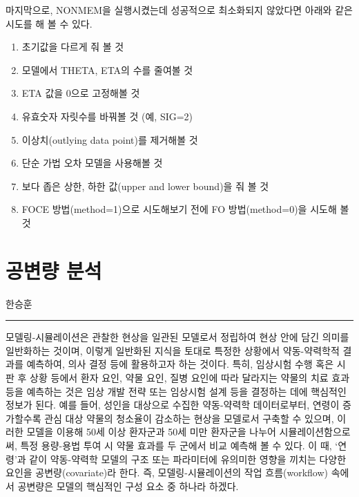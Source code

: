 \documentclass[
  11pt,
  krantz2,
  a4paper]{krantz}
\providecommand{\tightlist}{%
  \setlength{\itemsep}{0pt}\setlength{\parskip}{0pt}}
\theoremstyle{definition}
\theoremstyle{definition}
\theoremstyle{definition}
\theoremstyle{remark}
\begin{document}
마지막으로, NONMEM을 실행시켰는데 성공적으로 최소화되지 않았다면 아래와 같은 시도를 해 볼 수 있다.

\begin{enumerate}
\def\labelenumi{\arabic{enumi}.}
\tightlist
\item
  초기값을 다르게 줘 볼 것
\item
  모델에서 THETA, ETA의 수를 줄여볼 것
\item
  ETA 값을 0으로 고정해볼 것
\item
  유효숫자 자릿수를 바꿔볼 것 (예, SIG=2)
\item
  이상치(outlying data point)를 제거해볼 것 
\item
  단순 가법 오차 모델을 사용해볼 것
\item
  보다 좁은 상한, 하한 값(upper and lower bound)을 줘 볼 것
\item
  FOCE 방법(method=1)으로 시도해보기 전에 FO 방법(method=0)을 시도해 볼 것
\end{enumerate}

\hypertarget{covariate-analysis}{%
\chapter{공변량 분석}\label{covariate-analysis}}

\Large\hfill

한승훈
\normalsize

\begin{center}\rule{0.5\linewidth}{0.5pt}\end{center}

모델링-시뮬레이션은 관찰한 현상을 일관된 모델로서 정립하여 현상 안에 담긴 의미를 일반화하는 것이며, 이렇게 일반화된 지식을 토대로 특정한 상황에서 약동-약력학적 결과를 예측하여, 의사 결정 등에 활용하고자 하는 것이다. 특히, 임상시험 수행 혹은 시판 후 상황 등에서 환자 요인, 약물 요인, 질병 요인에 따라 달라지는 약물의 치료 효과 등을 예측하는 것은 임상 개발 전략 또는 임상시험 설계 등을 결정하는 데에 핵심적인 정보가 된다. 예를 들어, 성인을 대상으로 수집한 약동-약력학 데이터로부터, 연령이 증가할수록 관심 대상 약물의 청소율이 감소하는 현상을 모델로서 구축할 수 있으며, 이러한 모델을 이용해 50세 이상 환자군과 50세 미만 환자군을 나누어 시뮬레이션함으로써, 특정 용량-용법 투여 시 약물 효과를 두 군에서 비교 예측해 볼 수 있다. 이 때, `연령'과 같이 약동-약력학 모델의 구조 또는 파라미터에 유의미한 영향을 끼치는 다양한 요인을 공변량(covariate)라 한다. 즉, 모델링-시뮬레이션의 작업 흐름(workflow) 속에서 공변량은 모델의 핵심적인 구성 요소 중 하나라 하겠다.
\end{document}
